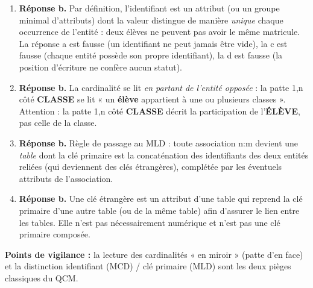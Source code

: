\documentclass[11pt]{article}
\begin{document}
\begin{corrige}
\begin{enumerate}
  \item \textbf{Réponse b.} Par définition, l'identifiant est un attribut (ou un groupe minimal d'attributs) dont la valeur distingue de manière \emph{unique} chaque occurrence de l'entité : deux élèves ne peuvent pas avoir le même matricule. La réponse a est fausse (un identifiant ne peut jamais être vide), la c est fausse (chaque entité possède son propre identifiant), la d est fausse (la position d'écriture ne confère aucun statut).
  \item \textbf{Réponse b.} La cardinalité se lit \emph{en partant de l'entité opposée} : la patte 1,n côté \textbf{CLASSE} se lit « un \textbf{élève} appartient à une ou plusieurs classes ». Attention : la patte 1,n côté \textbf{CLASSE} décrit la participation de l'\textbf{ÉLÈVE}, pas celle de la classe.
  \item \textbf{Réponse b.} Règle de passage au MLD : toute association n:m devient une \emph{table} dont la clé primaire est la concaténation des identifiants des deux entités reliées (qui deviennent des clés étrangères), complétée par les éventuels attributs de l'association.
  \item \textbf{Réponse b.} Une clé étrangère est un attribut d'une table qui reprend la clé primaire d'une autre table (ou de la même table) afin d'assurer le lien entre les tables. Elle n'est pas nécessairement numérique et n'est pas une clé primaire composée.
\end{enumerate}
\textbf{Points de vigilance :} la lecture des cardinalités « en miroir » (patte d'en face) et la distinction identifiant (MCD) / clé primaire (MLD) sont les deux pièges classiques du QCM.
\end{corrige}
\end{document}
